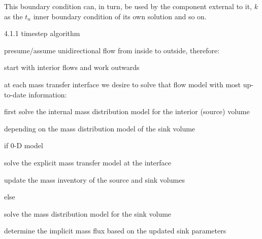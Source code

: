 This boundary condition can, in turn, be used by the component external to it, $k$ as the $t_n$ 
inner boundary condition of its own solution and so on.



4.1.1 timestep algorithm

presume/assume unidirectional flow from inside to outside, therefore:

start with interior flows and work outwards

at each mass transfer interface we desire to solve that flow model with most up-to-date information:

first solve the internal mass distribution model for the interior (source) volume

depending on the mass distribution model of the sink volume

if 0-D model

solve the explicit mass transfer model at the interface

update the mass inventory of the source and sink volumes


else

solve the mass distribution model for the sink volume

determine the implicit mass flux based on the updated sink parameters



